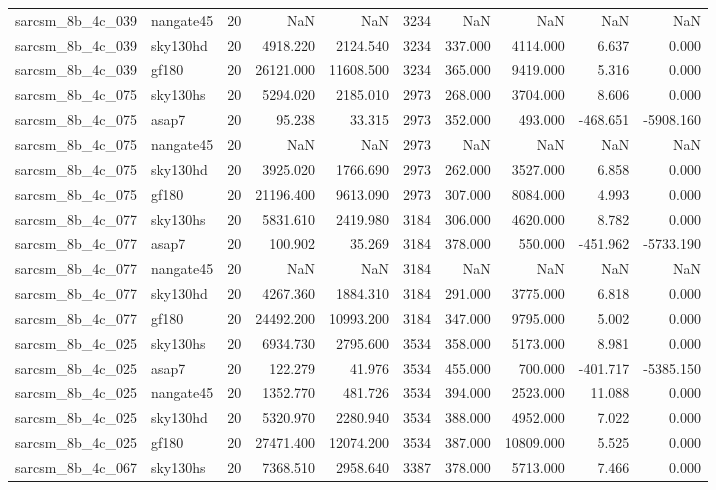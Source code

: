 \begin{tabular}{llrrrrrrrr}
sarcsm\_8b\_4c\_039 & nangate45 & 20 & NaN & NaN & 3234 & NaN & NaN & NaN & NaN \\
sarcsm\_8b\_4c\_039 & sky130hd & 20 & 4918.220 & 2124.540 & 3234 & 337.000 & 4114.000 & 6.637 & 0.000 \\
sarcsm\_8b\_4c\_039 & gf180 & 20 & 26121.000 & 11608.500 & 3234 & 365.000 & 9419.000 & 5.316 & 0.000 \\
sarcsm\_8b\_4c\_075 & sky130hs & 20 & 5294.020 & 2185.010 & 2973 & 268.000 & 3704.000 & 8.606 & 0.000 \\
sarcsm\_8b\_4c\_075 & asap7 & 20 & 95.238 & 33.315 & 2973 & 352.000 & 493.000 & -468.651 & -5908.160 \\
sarcsm\_8b\_4c\_075 & nangate45 & 20 & NaN & NaN & 2973 & NaN & NaN & NaN & NaN \\
sarcsm\_8b\_4c\_075 & sky130hd & 20 & 3925.020 & 1766.690 & 2973 & 262.000 & 3527.000 & 6.858 & 0.000 \\
sarcsm\_8b\_4c\_075 & gf180 & 20 & 21196.400 & 9613.090 & 2973 & 307.000 & 8084.000 & 4.993 & 0.000 \\
sarcsm\_8b\_4c\_077 & sky130hs & 20 & 5831.610 & 2419.980 & 3184 & 306.000 & 4620.000 & 8.782 & 0.000 \\
sarcsm\_8b\_4c\_077 & asap7 & 20 & 100.902 & 35.269 & 3184 & 378.000 & 550.000 & -451.962 & -5733.190 \\
sarcsm\_8b\_4c\_077 & nangate45 & 20 & NaN & NaN & 3184 & NaN & NaN & NaN & NaN \\
sarcsm\_8b\_4c\_077 & sky130hd & 20 & 4267.360 & 1884.310 & 3184 & 291.000 & 3775.000 & 6.818 & 0.000 \\
sarcsm\_8b\_4c\_077 & gf180 & 20 & 24492.200 & 10993.200 & 3184 & 347.000 & 9795.000 & 5.002 & 0.000 \\
sarcsm\_8b\_4c\_025 & sky130hs & 20 & 6934.730 & 2795.600 & 3534 & 358.000 & 5173.000 & 8.981 & 0.000 \\
sarcsm\_8b\_4c\_025 & asap7 & 20 & 122.279 & 41.976 & 3534 & 455.000 & 700.000 & -401.717 & -5385.150 \\
sarcsm\_8b\_4c\_025 & nangate45 & 20 & 1352.770 & 481.726 & 3534 & 394.000 & 2523.000 & 11.088 & 0.000 \\
sarcsm\_8b\_4c\_025 & sky130hd & 20 & 5320.970 & 2280.940 & 3534 & 388.000 & 4952.000 & 7.022 & 0.000 \\
sarcsm\_8b\_4c\_025 & gf180 & 20 & 27471.400 & 12074.200 & 3534 & 387.000 & 10809.000 & 5.525 & 0.000 \\
sarcsm\_8b\_4c\_067 & sky130hs & 20 & 7368.510 & 2958.640 & 3387 & 378.000 & 5713.000 & 7.466 & 0.000 \\

\end{tabular}
